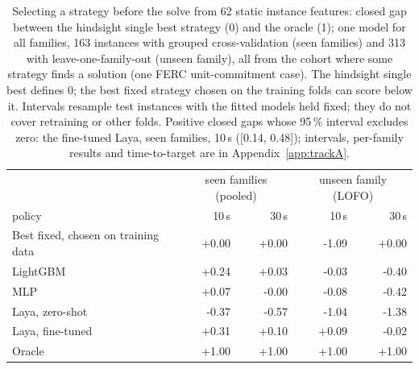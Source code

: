 \begin{table}[t]\centering\small
\begin{tabular}{lrrrr}
\toprule
& \multicolumn{2}{c}{seen families (pooled)} & \multicolumn{2}{c}{unseen family (LOFO)} \\
policy & 10\,s & 30\,s & 10\,s & 30\,s \\
\midrule
Best fixed, chosen on training data & +0.00 & +0.00 & -1.09 & +0.00 \\
LightGBM & +0.24 & +0.03 & -0.03 & -0.40 \\
MLP & +0.07 & -0.00 & -0.08 & -0.42 \\
Laya, zero-shot & -0.37 & -0.57 & -1.04 & -1.38 \\
Laya, fine-tuned & +0.31 & +0.10 & +0.09 & -0.02 \\
Oracle & +1.00 & +1.00 & +1.00 & +1.00 \\
\bottomrule
\end{tabular}
\caption{Selecting a strategy before the solve from 62 static instance features: closed gap between the hindsight single best strategy (0) and the oracle (1); one model for all families, 163 instances with grouped cross-validation (seen families) and 313 with leave-one-family-out (unseen family), all from the cohort where some strategy finds a solution (one FERC unit-commitment case). The hindsight single best defines 0; the best fixed strategy chosen on the training folds can score below it. Intervals resample test instances with the fitted models held fixed; they do not cover retraining or other folds. Positive closed gaps whose 95\,\% interval excludes zero: the fine-tuned Laya, seen families, 10\,s ([0.14, 0.48]); intervals, per-family results and time-to-target are in Appendix~\ref{app:trackA}.}\label{tab:selection}
\end{table}